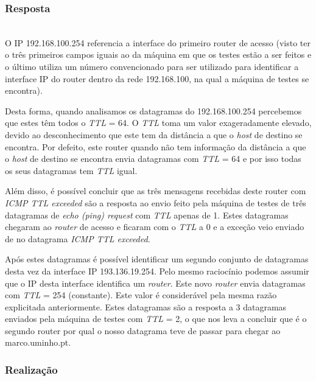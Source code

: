 \documentclass{llncs}
\begin{document}
\subsubsection{Resposta}\rule[-10pt]{0pt}{10pt}\\

O IP 192.168.100.254 referencia a interface do primeiro router de acesso (visto ter o três primeiros campos iguais ao da máquina em que os testes estão a ser feitos e o último utiliza um número convencionado para ser utilizado para identificar a interface IP do router dentro da rede 192.168.100, na qual a máquina de testes se encontra).

Desta forma, quando analisamos os datagramas do 192.168.100.254 percebemos que estes têm todos o \textit{TTL} = 64. O \textit{TTL} toma um valor exageradamente elevado, devido ao desconhecimento que este tem da distância a que o \textit{host} de destino se encontra. Por defeito, este router quando não tem informação da distância a que o \textit{host} de destino se encontra envia datagramas com \textit{TTL} = 64 e por isso todas os seus datagramas tem \textit{TTL} igual.

Além disso, é possível concluir que as três mensagens recebidas deste router com \textit{ICMP \textit{TTL} exceeded} são a resposta ao envio feito pela máquina de testes de três datagramas de \textit{echo (ping) request} com \textit{TTL} apenas de 1. Estes datagramas chegaram ao \textit{router} de acesso e ficaram com o \textit{TTL} a 0 e a exceção veio enviado de no datagrama \textit{ICMP \textit{TTL} exceeded}.

Após estes datagramas é possível identificar um segundo conjunto de datagramas desta vez da interface IP 193.136.19.254. Pelo mesmo raciocínio podemos assumir que o IP desta interface identifica um \textit{router}. Este novo \textit{router} envia datagramas com \textit{TTL} = 254 (constante). Este valor é considerável pela mesma razão explicitada anteriormente. Estes datagramas são a resposta a 3 datagramas enviados pela máquina de testes com \textit{TTL} = 2, o que nos leva a concluir que é o segundo router por qual o nosso datagrama teve de passar para chegar ao marco.uminho.pt.

\subsubsection{Realização}\rule[-10pt]{0pt}{10pt}\\
\end{document}
